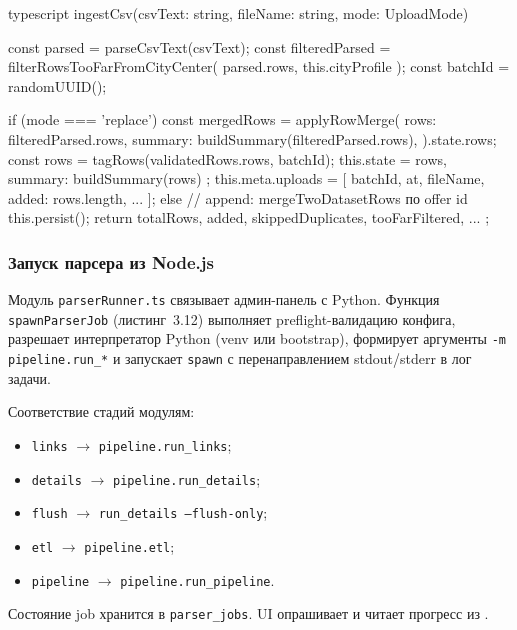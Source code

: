 \begin{singleminted}{typescript}
ingestCsv(csvText: string, fileName: string, mode: UploadMode) {
    const parsed = parseCsvText(csvText);
    const filteredParsed = filterRowsTooFarFromCityCenter(
        parsed.rows, this.cityProfile
    );
    const batchId = randomUUID();

    if (mode === 'replace') {
        const mergedRows = applyRowMerge({
            rows: filteredParsed.rows,
            summary: buildSummary(filteredParsed.rows),
        }).state.rows;
        const rows = tagRows(validatedRows.rows, batchId);
        this.state = { rows, summary: buildSummary(rows) };
        this.meta.uploads = [{ batchId, at, fileName, added: rows.length, ... }];
    } else {
        // append: mergeTwoDatasetRows по offer id
    }
    this.persist();
    return { totalRows, added, skippedDuplicates, tooFarFiltered, ... };
}
\end{singleminted}
\label{lst:ingest-csv}

\subsubsection{Запуск парсера из Node.js}

Модуль \texttt{parserRunner.ts} связывает админ-панель с Python. Функция \texttt{spawnParserJob} (листинг~3.12) выполняет preflight-валидацию конфига, разрешает интерпретатор Python (venv или bootstrap), формирует аргументы \texttt{-m pipeline.run\_*} и запускает \texttt{spawn} с перенаправлением stdout/stderr в лог задачи.

Соответствие стадий модулям:
\begin{itemize}
    \item \texttt{links} $\rightarrow$ \texttt{pipeline.run\_links};
    \item \texttt{details} $\rightarrow$ \texttt{pipeline.run\_details};
    \item \texttt{flush} $\rightarrow$ \texttt{run\_details --flush-only};
    \item \texttt{etl} $\rightarrow$ \texttt{pipeline.etl};
    \item \texttt{pipeline} $\rightarrow$ \texttt{pipeline.run\_pipeline}.
\end{itemize}

Состояние job хранится в \texttt{parser\_jobs}. UI опрашивает  и читает прогресс из .

